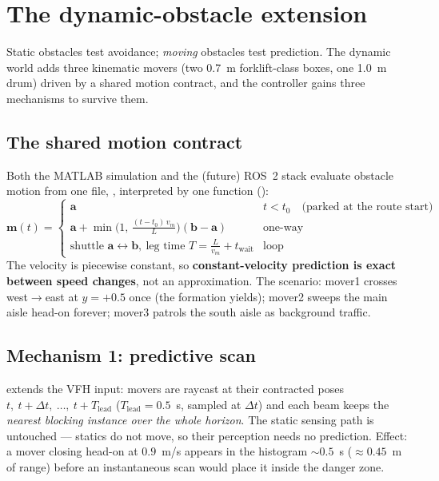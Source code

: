 \section{The dynamic-obstacle extension}
\label{sec:dynamic}

Static obstacles test avoidance; \emph{moving} obstacles test prediction. The
dynamic world adds three kinematic movers (two 0.7~m forklift-class boxes, one
1.0~m drum) driven by a shared motion contract, and the controller gains three
mechanisms to survive them.

\subsection{The shared motion contract}

Both the MATLAB simulation and the (future) ROS~2 stack evaluate obstacle
motion from one file, , interpreted by one
function ():
%
\[
\mathbf{m}(t) =
\begin{cases}
\mathbf{a} & t < t_0 \quad \text{(parked at the route start)}\\[2pt]
\mathbf{a} + \min\!\bigl(1,\, \tfrac{(t - t_0)\,v_m}{L}\bigr)(\mathbf{b} - \mathbf{a})
& \text{one-way}\\[4pt]
\text{shuttle } \mathbf{a} \leftrightarrow \mathbf{b},\ \text{leg time } 
T = \tfrac{L}{v_m} + t_{\mathrm{wait}} & \text{loop}
\end{cases}
\]
%
The velocity is piecewise constant, so \textbf{constant-velocity prediction is
exact between speed changes}, not an approximation. The scenario: mover1
crosses west$\to$east at $y = +0.5$ once (the formation yields); mover2 sweeps
the main aisle head-on forever; mover3 patrols the south aisle as background
traffic.

\subsection{Mechanism 1: predictive scan}

 extends the VFH input: movers are raycast at their
contracted poses $t,\ t+\Delta t,\ \dots,\ t+T_{\mathrm{lead}}$
($T_{\mathrm{lead}} = 0.5$~s, sampled at $\Delta t$) and each beam keeps the
\emph{nearest blocking instance over the whole horizon}. The static sensing
path is untouched --- statics do not move, so their perception needs no
prediction. Effect: a mover closing head-on at $0.9$~m/s appears in the
histogram $\sim 0.5$~s ($\approx 0.45$~m of range) before an instantaneous
scan would place it inside the danger zone.

